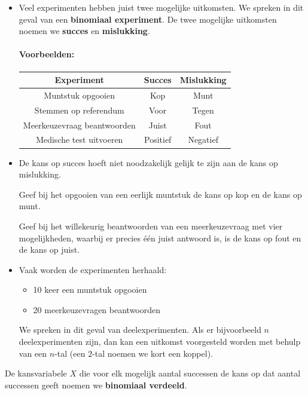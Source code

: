 \documentclass[12pt,twoside]{article}
\begin{document}
\begin{itemize}
  \item Veel experimenten hebben juist twee mogelijke uitkomsten. We spreken in dit geval van een {\bf binomiaal experiment}. De twee mogelijke uitkomsten noemen we {\bf succes} en {\bf mislukking}.
  \paragraph*{Voorbeelden:}
  \begin{center}
    \begin{tabular}{c|c|c}
    Experiment & Succes & Mislukking\\
    \hline
    Muntstuk opgooien & Kop & Munt\\
    Stemmen op referendum & Voor & Tegen\\
    Meerkeuzevraag beantwoorden & Juist & Fout\\
    Medische test uitvoeren & Positief & Negatief\\
    \end{tabular}
  \end{center}
  \item De kans op succes hoeft niet noodzakelijk gelijk te zijn aan de kans op mislukking.
  \begin{oefening}
  Geef bij het opgooien van een eerlijk muntstuk de kans op kop en de kans op munt.
  \end{oefening}
  \begin{oefening}
  Geef bij het willekeurig beantwoorden van een meerkeuzevraag met vier mogelijkheden, waarbij er precies één juist antwoord is, is de kans op fout en de kans op juist.
  \end{oefening}

  \item Vaak worden de experimenten herhaald:
  \begin{itemize}
    \item 10 keer een muntstuk opgooien
    \item 20 meerkeuzevragen beantwoorden
  \end{itemize}
  We spreken in dit geval van deelexperimenten. Als er bijvoorbeeld $n$ deelexperimenten zijn, dan kan een uitkomst voorgesteld worden met behulp van een $n$-tal (een $2$-tal noemen we kort een koppel).
\end{itemize}

De kansvariabele $X$ die voor elk mogelijk aantal successen de kans op dat aantal successen geeft noemen we {\bf binomiaal verdeeld}.
\end{document}

